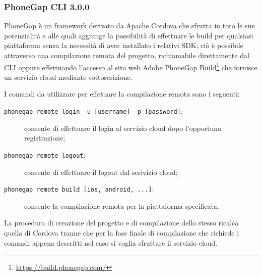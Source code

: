 \subsubsection{PhoneGap CLI 3.0.0}
PhoneGap è un framework derivato da Apache Cordova che sfrutta in toto le sue potenzialità e alle quali aggiunge la possibilità di effettuare le build per qualsiasi piattaforma senza la necessità di aver installato i relativi SDK; ciò è possibile attraverso una compilazione remota del progetto, richiamabile direttamente dal CLI oppure effettuando l'accesso al sito web Adobe PhoneGap Build\footnote{\url{https://build.phonegap.com/}} che fornisce un servizio cloud mediante sottoscrizione.

I comandi da utilizzare per effetuare la compilazione remota sono i seguenti:
\begin{description}
\item[\texttt{phonegap remote login -u [username] -p [password]}:] consente di effettuare il login al servizio cloud dopo l'opportuna registrazione;
\item[\texttt{phonegap remote logout}:] consente di effettuare il logout dal serivizio cloud;
\item[\texttt{phonegap remote build [ios, android, ...]}:] consente la compilazione remota per la piattaforma specificata.
\end{description}

La procedura di creazione del progetto e di compilazione dello stesso ricalca quella di Cordova tranne che per la fase finale di compilazione che richiede i comandi appena descritti nel caso si voglia sfruttare il servizio cloud.

